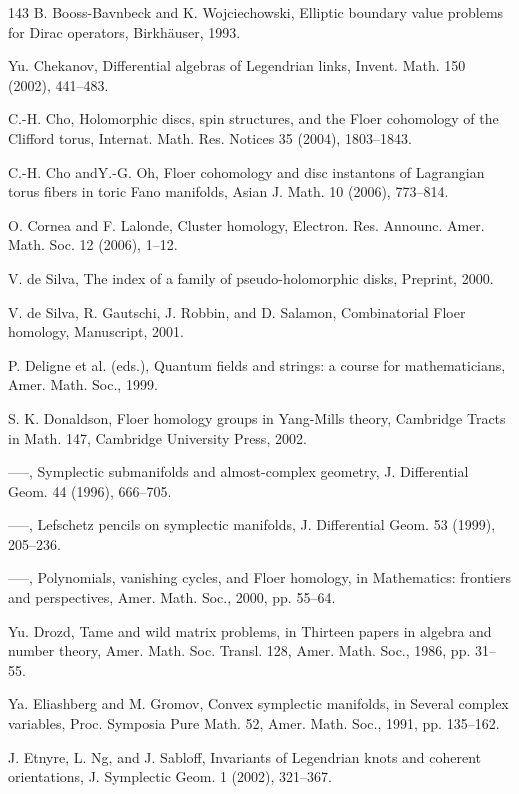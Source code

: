 \begin{thebibliography}{143}
 B. Booss-Bavnbeck and K. Wojciechowski, Elliptic boundary value problems for Dirac operators, Birkhäuser, 1993.

 Yu. Chekanov, Differential algebras of Legendrian links, Invent. Math. 150 (2002), 441–483.

 C.-H. Cho, Holomorphic discs, spin structures, and the Floer cohomology of the Clifford torus, Internat. Math. Res. Notices 35 (2004), 1803–1843.

 C.-H. Cho andY.-G. Oh, Floer cohomology and disc instantons of Lagrangian torus fibers in toric Fano manifolds, Asian J. Math. 10 (2006), 773–814.

 O. Cornea and F. Lalonde, Cluster homology, Electron. Res. Announc. Amer. Math. Soc. 12 (2006), 1–12.

 V. de Silva, The index of a family of pseudo-holomorphic disks, Preprint, 2000.

 V. de Silva, R. Gautschi, J. Robbin, and D. Salamon, Combinatorial Floer homology, Manuscript, 2001.

 P. Deligne et al. (eds.), Quantum fields and strings: a course for mathematicians, Amer. Math. Soc., 1999.

 S. K. Donaldson, Floer homology groups in Yang-Mills theory, Cambridge Tracts in Math. 147, Cambridge University Press, 2002.

 —–, Symplectic submanifolds and almost-complex geometry, J. Differential Geom. 44 (1996), 666–705.

 —–, Lefschetz pencils on symplectic manifolds, J. Differential Geom. 53 (1999), 205–236.

 —–, Polynomials, vanishing cycles, and Floer homology, in Mathematics: frontiers and perspectives, Amer. Math. Soc., 2000, pp. 55–64.

 Yu. Drozd, Tame and wild matrix problems, in Thirteen papers in algebra and number theory, Amer. Math. Soc. Transl. 128, Amer. Math. Soc., 1986, pp. 31–55.

 Ya. Eliashberg and M. Gromov, Convex symplectic manifolds, in Several complex variables, Proc. Symposia Pure Math. 52, Amer. Math. Soc., 1991, pp. 135–162.

 J. Etnyre, L. Ng, and J. Sabloff, Invariants of Legendrian knots and coherent orientations, J. Symplectic Geom. 1 (2002), 321–367.


\end{thebibliography}
